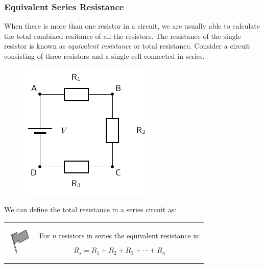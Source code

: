            \subsubsection{ Equivalent Series Resistance}
            \nopagebreak
            \label{m38776*id63926}When there is more than one resistor in a circuit, we are usually able to calculate the total combined resitance of all the resistors. The resistance of the single resistor is known as \textsl{equivalent resistance} or total resistance.
Consider a circuit consisting of three resistors and a single cell connected in series.\par 
          \label{m38776*id63930}
    \setcounter{subfigure}{0}
	\begin{figure}[H] %
    \begin{center}
    \label{m38776*id63934!!!underscore!!!media}\label{m38776*id63934!!!underscore!!!printimage}\includegraphics[width=0.4\columnwidth]{col11305.imgs/m38776_PG11C9_007.png} %
      \vspace{2pt}
    \vspace{.1in}
    \end{center}
 \end{figure}       
          \par 
\label{m38776*eip-546}We can define the total resistance in a series circuit as:\par \label{m38776*fhsst!!!underscore!!!id788}\begin{definition}
	  \begin{tabular*}{15 cm}{m{15 mm}m{}}
	\hspace*{-50pt}  \includegraphics[width=0.5in]{col11305.imgs/psflag2.png}   & \Definition{   \label{id2485652}\textbf{ Equivalent resistance in a series circuit, ${R}_{s}$ }} { \label{m38776*meaningfhsst!!!underscore!!!id788}
          \label{m38776*id64628}For $n$ resistors in series the equivalent resistance is:\par 
          \label{m38776*uid2532}\nopagebreak\noindent{}
            
    \begin{equation}
    {R}_{s}={R}_{1}+{R}_{2}+{R}_{3}+\cdots +{R}_{n}\tag{16.31}
      \end{equation}
           } 
      \end{tabular*}
      \end{definition}

